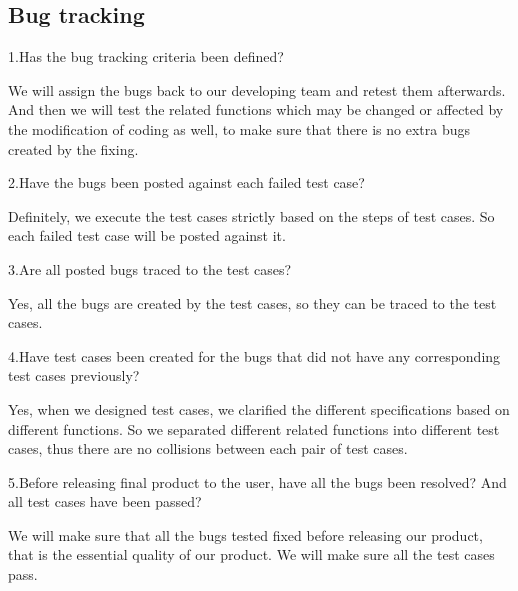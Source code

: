 \documentclass[12pt]{article}
\begin{document}
\subsection{Bug tracking}

\begin{description}
\item{1.Has the bug tracking criteria been defined?}
\item{We will assign the bugs back to our developing team and retest them afterwards. And then we will test the related functions which may be changed or affected by the modification of coding as well, to make sure that there is no extra bugs created by the fixing.}

\item{2.Have the bugs been posted against each failed test case?}
\item{Definitely, we execute the test cases strictly based on the steps of test cases. So each failed test case will be posted against it.}

\item{3.Are all posted bugs traced to the test cases? }
\item{Yes, all the bugs are created by the test cases, so they can be traced to the test cases.}

\item{4.Have test cases been created for the bugs that did not have any corresponding test cases previously?}
\item{Yes, when we designed test cases, we clarified the different specifications based on different functions. So we separated different related functions into different test cases, thus there are no collisions between each pair of test cases.}

\item{5.Before releasing final product to the user, have all the bugs been resolved? And all test cases have been passed?}
\item{We will make sure that all the bugs tested fixed before releasing our product, that is the essential quality of our product. We will make sure all the test cases pass.}
\end{description}
\end{document}
